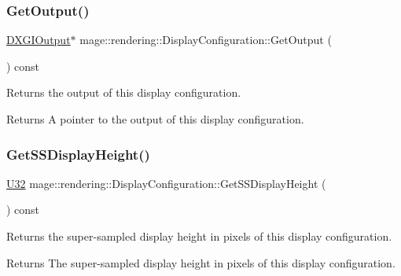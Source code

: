 \subsubsection{\texorpdfstring{Get\+Output()}{GetOutput()}}
{\footnotesize\ttfamily \hyperlink{namespacemage_1_1rendering_aaf22d3893277a4bd8497f6ea69b01532}{D\+X\+G\+I\+Output}$\ast$ mage\+::rendering\+::\+Display\+Configuration\+::\+Get\+Output (\begin{DoxyParamCaption}{ }\end{DoxyParamCaption}) const\hspace{0.3cm}{\ttfamily [noexcept]}}

Returns the output of this display configuration.

\begin{DoxyReturn}{Returns}
A pointer to the output of this display configuration. 
\end{DoxyReturn}
\hypertarget{classmage_1_1rendering_1_1_display_configuration_a7bbb45919b9cd4ae20cc9f4cac8a7069}{}\label{classmage_1_1rendering_1_1_display_configuration_a7bbb45919b9cd4ae20cc9f4cac8a7069} 
\subsubsection{\texorpdfstring{Get\+S\+S\+Display\+Height()}{GetSSDisplayHeight()}}
{\footnotesize\ttfamily \hyperlink{namespacemage_a41c104c036fba3756a74e19f793eeaa1}{U32} mage\+::rendering\+::\+Display\+Configuration\+::\+Get\+S\+S\+Display\+Height (\begin{DoxyParamCaption}{ }\end{DoxyParamCaption}) const\hspace{0.3cm}{\ttfamily [noexcept]}}

Returns the super-\/sampled display height in pixels of this display configuration.

\begin{DoxyReturn}{Returns}
The super-\/sampled display height in pixels of this display configuration. 
\end{DoxyReturn}
\hypertarget{classmage_1_1rendering_1_1_display_configuration_a1e55018800cb0c229571274c4f6c222c}{}\label{classmage_1_1rendering_1_1_display_configuration_a1e55018800cb0c229571274c4f6c222c} 
